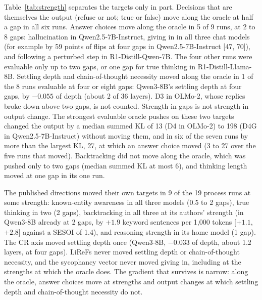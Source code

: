 \documentclass[11pt]{article}
\begin{document}
Table~\ref{tab:strength} separates the targets only in part. Decisions that are themselves the output (refuse or not; true or false) move along the oracle at half a gap in all six runs. Answer choices move along the oracle in 5 of 9 runs, at 2 to 8 gaps: hallucination in Qwen2.5-7B-Instruct, giving in in all three chat models (for example by 59 points of flips at four gaps in Qwen2.5-7B-Instruct [47, 70]), and following a perturbed step in R1-Distill-Qwen-7B. The four other runs were evaluable only up to two gaps, or one gap for true thinking in R1-Distill-Llama-8B. Settling depth and chain-of-thought necessity moved along the oracle in 1 of the 8 runs evaluable at four or eight gaps: Qwen3-8B's settling depth at four gaps, by $-0.055$ of depth (about 2 of 36 layers). D3 in OLMo-2, whose replies broke down above two gaps, is not counted. Strength in gaps is not strength in output change. The strongest evaluable oracle pushes on these two targets changed the output by a median summed KL of 13 (D4 in OLMo-2) to 198 (D4G in Qwen2.5-7B-Instruct) without moving them, and in six of the seven runs by more than the largest KL, 27, at which an answer choice moved (3 to 27 over the five runs that moved). Backtracking did not move along the oracle, which was pushed only to two gaps (median summed KL at most 6), and thinking length moved at one gap in its one run.

The published directions moved their own targets in 9 of the 19 process runs at some strength: known-entity awareness in all three models (0.5 to 2 gaps), true thinking in two (2 gaps), backtracking in all three at its authors' strength (in Qwen3-8B already at 2 gaps, by $+1.9$ keyword sentences per 1,000 tokens [$+1.1$, $+2.8$] against a SESOI of 1.4), and reasoning strength in its home model (1 gap). The CR axis moved settling depth once (Qwen3-8B, $-0.033$ of depth, about 1.2 layers, at four gaps). LiReFs never moved settling depth or chain-of-thought necessity, and the sycophancy vector never moved giving in, including at the strengths at which the oracle does. The gradient that survives is narrow: along the oracle, answer choices move at strengths and output changes at which settling depth and chain-of-thought necessity do not.
\end{document}

